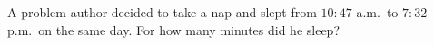 A problem author decided to take a nap and slept from $10{:}47$ a.m.\ to $7{:}32$ p.m.\ on the same day. For how many minutes did he sleep?
